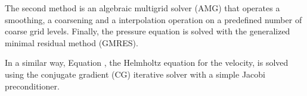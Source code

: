 \documentclass{sig-alternate}
\begin{document}
The second method is an algebraic multigrid solver (AMG) that operates a smoothing, a coarsening and a interpolation operation on a predefined number of coarse grid levels. Finally, the pressure equation is solved with the generalized minimal residual method (GMRES).

In a similar way, Equation , the Helmholtz equation for the velocity, is solved using the conjugate gradient (CG) iterative solver with a simple Jacobi preconditioner.
\end{document}
